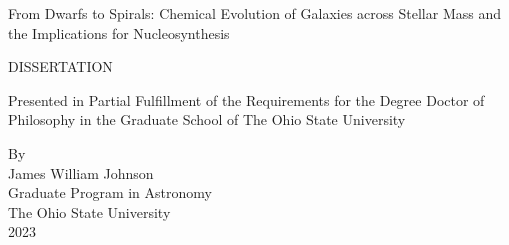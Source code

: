 %
%
%
%
%
%

\begin{titlepage}

%
%


\begin{center}
\begin{singlespace}
\vspace*{1.3cm}
{\Large
From Dwarfs to Spirals: Chemical Evolution of Galaxies across Stellar Mass and
the Implications for Nucleosynthesis
}
\end{singlespace}

%
%
%
%
%

\vspace*{1.5cm}

DISSERTATION\\
\vspace*{1.5cm}
\begin{singlespace}
Presented in Partial Fulfillment of the Requirements for
the Degree Doctor of Philosophy in the Graduate School of The Ohio 
State University\\
\end{singlespace}
\vspace*{1.0cm}


%
%
%
\begin{doublespace}
By
\\
James William Johnson
\\
Graduate Program in Astronomy
\\
\vspace*{1.0cm}
The Ohio State University\\
2023\\


\end{doublespace}
\end{center}
\end{titlepage}
